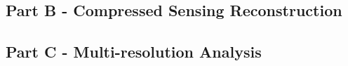 \documentclass[11pt]{article}
\begin{document}
\subsection{Part B - Compressed Sensing Reconstruction}

\subsection{Part C - Multi-resolution Analysis}





\end{document}
